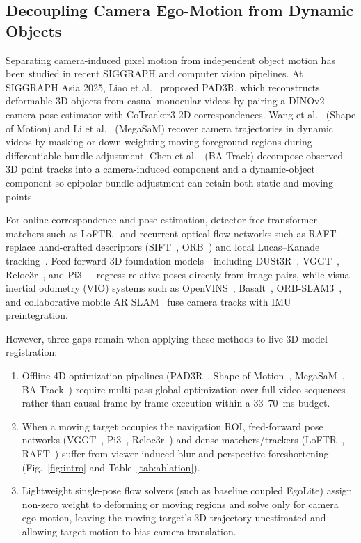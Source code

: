 \documentclass[journal]{IEEEtran}
\begin{document}
\subsection{Decoupling Camera Ego-Motion from Dynamic Objects}
Separating camera-induced pixel motion from independent object motion has been studied in recent SIGGRAPH and computer vision pipelines. At SIGGRAPH Asia 2025, Liao et al.~\cite{liao2025pad3r} proposed PAD3R, which reconstructs deformable 3D objects from casual monocular videos by pairing a DINOv2 camera pose estimator with CoTracker3 2D correspondences. Wang et al.~\cite{wang2025shape} (Shape of Motion) and Li et al.~\cite{li2025megasam} (MegaSaM) recover camera trajectories in dynamic videos by masking or down-weighting moving foreground regions during differentiable bundle adjustment. Chen et al.~\cite{chen2025batrack} (BA-Track) decompose observed 3D point tracks into a camera-induced component and a dynamic-object component so epipolar bundle adjustment can retain both static and moving points.

For online correspondence and pose estimation, detector-free transformer matchers such as LoFTR~\cite{sun2021loftr} and recurrent optical-flow networks such as RAFT~\cite{teed2020raft} replace hand-crafted descriptors (SIFT~\cite{lowe2004distinctive}, ORB~\cite{rublee2011orb}) and local Lucas--Kanade tracking~\cite{lucas1981iterative}. Feed-forward 3D foundation models---including DUSt3R~\cite{wang2024dust3r}, VGGT~\cite{wang2025vggt}, Reloc3r~\cite{dong2025reloc3r}, and Pi3~\cite{wang2025pi3}---regress relative poses directly from image pairs, while visual-inertial odometry (VIO) systems such as OpenVINS~\cite{geneva2020openvins}, Basalt~\cite{usenko2020basalt}, ORB-SLAM3~\cite{campos2021orbslam3}, and collaborative mobile AR SLAM~\cite{pan2024collaborative} fuse camera tracks with IMU preintegration.

However, three gaps remain when applying these methods to live 3D model registration:
\begin{enumerate}
    \item Offline 4D optimization pipelines (PAD3R~\cite{liao2025pad3r}, Shape of Motion~\cite{wang2025shape}, MegaSaM~\cite{li2025megasam}, BA-Track~\cite{chen2025batrack}) require multi-pass global optimization over full video sequences rather than causal frame-by-frame execution within a $33\text{--}70$~ms budget.
    \item When a moving target occupies the navigation ROI, feed-forward pose networks (VGGT~\cite{wang2025vggt}, Pi3~\cite{wang2025pi3}, Reloc3r~\cite{dong2025reloc3r}) and dense matchers/trackers (LoFTR~\cite{sun2021loftr}, RAFT~\cite{teed2020raft}) suffer from viewer-induced blur and perspective foreshortening (Fig.~\ref{fig:intro} and Table~\ref{tab:ablation}).
    \item Lightweight single-pose flow solvers (such as baseline coupled EgoLite) assign non-zero weight to deforming or moving regions and solve only for camera ego-motion, leaving the moving target's 3D trajectory unestimated and allowing target motion to bias camera translation.
\end{enumerate}
\end{document}
